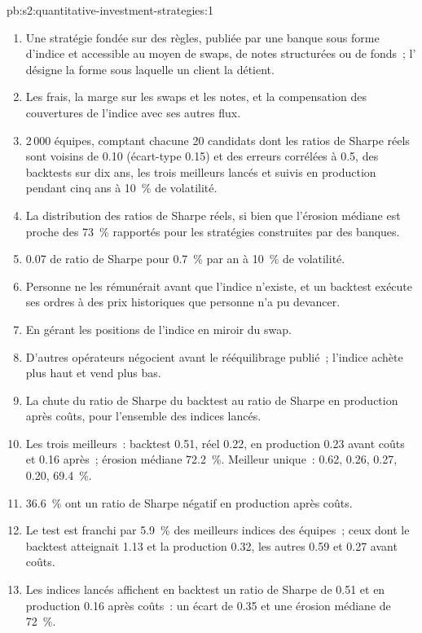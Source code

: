 \begin{solution}{pb:s2:quantitative-investment-strategies:1}
\begin{enumerate}
\item Une stratégie fondée sur des règles, publiée par une banque sous forme d'indice et accessible au moyen de swaps, de notes structurées ou de fonds~; l' désigne la forme sous laquelle un client
la détient.
\item Les frais, la marge sur les swaps et les notes, et la compensation des couvertures de l'indice avec ses autres flux.
\item 2\,000 équipes, comptant chacune 20 candidats dont les ratios de Sharpe réels sont voisins de 0.10 (écart-type 0.15) et des erreurs corrélées à 0.5, des backtests sur dix ans, les trois meilleurs
lancés et suivis en production pendant cinq ans à 10~\% de volatilité.
\item La distribution des ratios de Sharpe réels, si bien que l'érosion médiane est proche des 73~\% rapportés pour les stratégies construites par des banques.
\item 0.07 de ratio de Sharpe pour 0.7~\% par an à 10~\% de volatilité.
\item Personne ne les rémunérait avant que l'indice n'existe, et un backtest exécute ses ordres à des prix historiques que personne n'a pu devancer.
\item En gérant les positions de l'indice en miroir du swap.
\item D'autres opérateurs négocient avant le rééquilibrage publié~; l'indice achète plus haut et vend plus bas.
\item La chute du ratio de Sharpe du backtest au ratio de Sharpe en production après coûts, pour l'ensemble des indices lancés.
\item Les trois meilleurs~: backtest 0.51, réel 0.22, en production 0.23 avant coûts et 0.16 après~; érosion médiane 72.2~\%. Meilleur unique~: 0.62, 0.26, 0.27, 0.20, 69.4~\%.
\item 36.6~\% ont un ratio de Sharpe négatif en production après coûts.
\item Le test est franchi par 5.9~\% des meilleurs indices des équipes~; ceux dont le backtest atteignait 1.13 et la production 0.32, les autres 0.59 et 0.27 avant coûts.
\item Les indices lancés affichent en backtest un ratio de Sharpe de 0.51 et en production 0.16 après coûts~: un écart de 0.35 et une érosion médiane de 72~\%.

\end{enumerate}
\end{solution}
